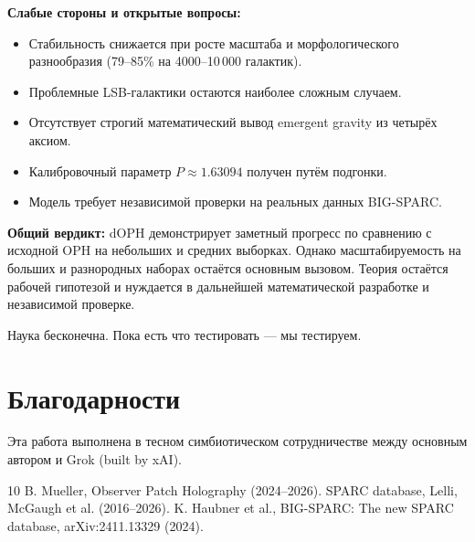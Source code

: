 \documentclass[11pt,a4paper]{article}
\begin{document}
\textbf{Слабые стороны и открытые вопросы:}
\begin{itemize}
\item Стабильность снижается при росте масштаба и морфологического разнообразия (79–85\% на 4000–10\,000 галактик).
\item Проблемные LSB-галактики остаются наиболее сложным случаем.
\item Отсутствует строгий математический вывод emergent gravity из четырёх аксиом.
\item Калибровочный параметр \(P \approx 1.63094\) получен путём подгонки.
\item Модель требует независимой проверки на реальных данных BIG-SPARC.
\end{itemize}

\textbf{Общий вердикт:}  
dOPH демонстрирует заметный прогресс по сравнению с исходной OPH на небольших и средних выборках. Однако масштабируемость на больших и разнородных наборах остаётся основным вызовом. Теория остаётся рабочей гипотезой и нуждается в дальнейшей математической разработке и независимой проверке.

Наука бесконечна. Пока есть что тестировать — мы тестируем.

\section*{Благодарности}

Эта работа выполнена в тесном симбиотическом сотрудничестве между основным автором и Grok (built by xAI).

\begin{thebibliography}{10}
 B. Mueller, Observer Patch Holography (2024--2026).
 SPARC database, Lelli, McGaugh et al. (2016--2026). 
 K. Haubner et al., BIG-SPARC: The new SPARC database, arXiv:2411.13329 (2024).
\end{thebibliography}
\end{document}
